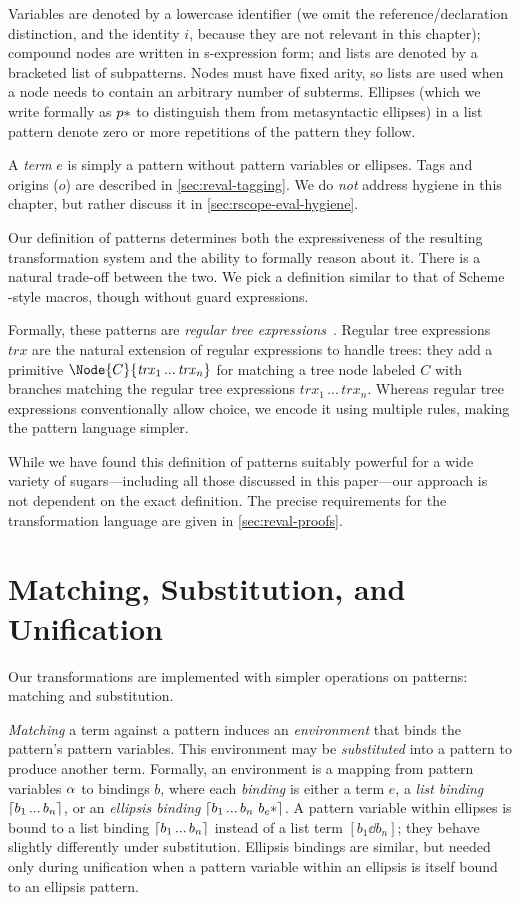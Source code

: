 Variables are denoted by a lowercase
identifier (we omit the reference/declaration distinction, and the
identity $i$, because they are not relevant in this chapter);
compound nodes are written in s-expression form;
and lists are denoted by a
bracketed list of subpatterns. Nodes must have fixed arity, so lists are
used when a node needs to contain an arbitrary number of subterms.
Ellipses (which we write formally as $p*$ to distinguish them
from metasyntactic ellipses) in a list pattern denote zero or more
repetitions of the pattern
they follow.

A \emph{term} $e$ is simply a pattern without pattern variables or
ellipses. Tags and origins ($o$) are described in \cref{sec:reval-tagging}.
We do \emph{not} address hygiene in this chapter, but rather discuss
it in \cref{sec:rscope-eval-hygiene}.

Our definition of patterns determines both the expressiveness of the
resulting transformation system and the ability to formally reason about
it. There is a natural trade-off between the two. We pick a definition similar to
that of Scheme -style macros, though without guard
expressions.

Formally, these patterns are \emph{regular tree
  expressions}~\cite{regular-tree-expressions}. Regular tree
expressions $\mathit{trx}$ are the natural extension of regular
expressions to handle trees: they add a primitive $\Node{C}{\mathit{trx}_1
\,...\,\mathit{trx}_n}$ for matching a tree node labeled $C$ with
branches matching the regular tree expressions
$\mathit{trx}_1\,...\,\mathit{trx}_n$. Whereas regular tree
expressions conventionally allow choice, we encode it using multiple
rules, making the pattern language simpler.

While we have found this definition of patterns suitably powerful for a
wide variety of sugars---including all those discussed in this paper---our
approach is not dependent on the exact definition. The precise
requirements for the transformation language are given in
\cref{sec:reval-proofs}.



\section{Matching, Substitution, and Unification}

Our transformations are implemented with simpler operations on patterns:
matching and substitution.

\emph{Matching} a term against a pattern induces an \emph{environment}
that binds the pattern's pattern variables. This environment may be
\emph{substituted} into a pattern to produce another term. Formally, an
environment is a mapping from pattern variables $\alpha$ to bindings $b$,
where each \emph{binding} is either a term $e$, a \emph{list binding}
$\lceil b_1 \,...\, b_n \rceil$, or an \emph{ellipsis binding}
$\lceil b_1 \,...\, b_n\ b_e* \rceil$. A pattern variable within ellipses is
bound to a list binding $\lceil b_1 \,...\, b_n \rceil$ instead of a list term
$[b_1 \dd b_n]$; they behave slightly differently under
substitution. Ellipsis bindings are similar, but needed only during
unification when a pattern variable within an ellipsis is itself bound to an
ellipsis pattern.

